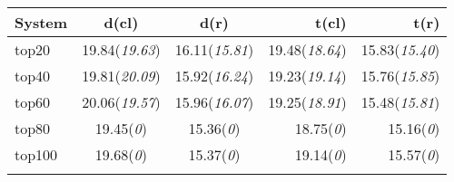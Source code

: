 \begin{tabular}{lccrr} 

\toprule
System & d(cl) & d(r) & t(cl) & t(r) \\
\toprule

top20 & 19.84(\emph{19.63}) & 16.11(\emph{15.81}) & 19.48(\emph{18.64}) & 15.83(\emph{15.40}) \\
top40 & 19.81(\emph{20.09}) & 15.92(\emph{16.24}) & 19.23(\emph{19.14}) & 15.76(\emph{15.85}) \\
top60 & 20.06(\emph{19.57}) & 15.96(\emph{16.07}) & 19.25(\emph{18.91}) & 15.48(\emph{15.81}) \\
top80 & 19.45(\emph{0}) & 15.36(\emph{0}) & 18.75(\emph{0}) & 15.16(\emph{0}) \\
top100 & 19.68(\emph{0}) & 15.37(\emph{0}) & 19.14(\emph{0}) & 15.57(\emph{0}) \\

\bottomrule
\centering
\small
\label{table:topn}
\end{tabular}



